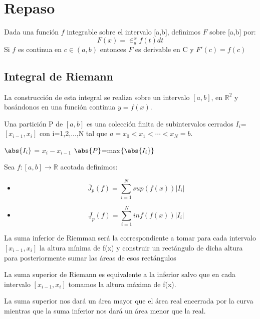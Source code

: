 \documentclass{apuntes}
\begin{document}
\chapter{Repaso}
\begin{theorem}
Dada una función $f$ integrable sobre el intervalo [a,b], definimos $F$ sobre [a,b] por:
\[F(x)=\in_{a}^{x}f(t)dt\]
Si $f$ es continua en $c\in (a,b)$ entonces $F$ es derivable en C y $F'(c)=f(c)$
\end{theorem}

\section{Integral de Riemann}
La construcción de esta integral se realiza sobre un intervalo $[a,b]$, en $\mathbb{R}^2$ y basándonos en una función continua $y=f(x)$.

\begin{defn}[Partición]
Una partición P de $[a,b]$ es una colección finita de subintervalos cerrados $I_i$=$[x_{i-1}, x_i]$ con i=1,2,...,N tal que $a=x_0<x_1<\cdots < x_N=b$.

$\abs{I_i}$ = $x_i-x_{i-1}$
$\abs{P}$=max$\lbrace \abs{I_i} \rbrace$
\end{defn}

Sea $f:[ a,b ] \rightarrow \mathbb{R}$ acotada definimos:
\begin{itemize}
\item \begin{defn}
\[\overline{J}_p(f)=\sum_{i=1}^{N}sup(f(x))|I_i|\]
\end{defn}
\item \begin{defn}
\[\underline{J}_p(f)=\sum_{i=1}^{N}inf(f(x))|I_i|\]
\end{defn}
\end{itemize}

La suma inferior de Riemman será la correspondiente a tomar para cada intervalo $[x_{i-1}, x_i]$ la altura mínima de f(x) y construir un rectángulo de dicha altura para posteriormente sumar las áreas de esos rectángulos

La suma superior de Riemann es equivalente a la inferior salvo que en cada intervalo $[x_{i-1}, x_i]$ tomamos la altura máxima de f(x).

La suma superior nos dará un área mayor que el área real encerrada por la curva mientras que la suma inferior nos dará un área menor que la real.
\end{document}
